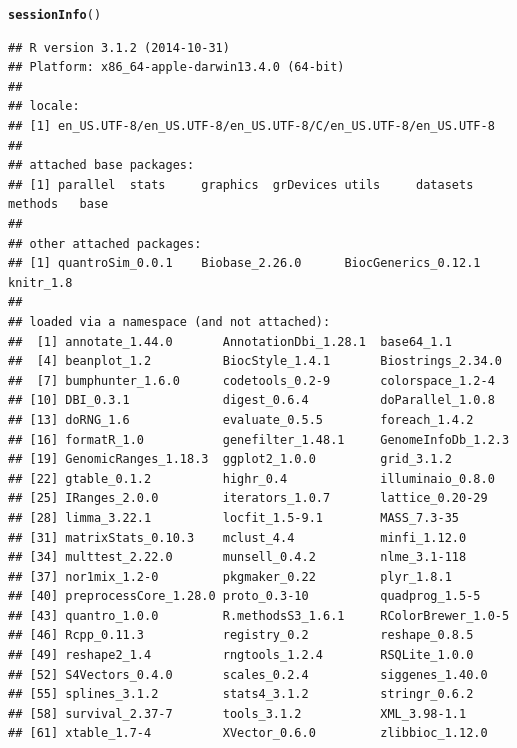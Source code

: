 \documentclass{article}\usepackage[]{graphicx}\usepackage[usenames,dvipsnames]{color}
\makeatletter
\newcommand{\hlstd}[1]{\textcolor[rgb]{0.345,0.345,0.345}{#1}}%
\newcommand{\hlkwd}[1]{\textcolor[rgb]{0.737,0.353,0.396}{\textbf{#1}}}%
\newenvironment{kframe}{%
 \def\at@end@of@kframe{}%
 \ifinner\ifhmode%
  \def\at@end@of@kframe{\end{minipage}}%
  \begin{minipage}{\columnwidth}%
 \fi\fi%
 \def\FrameCommand##1{\hskip\@totalleftmargin \hskip-\fboxsep
 \colorbox{shadecolor}{##1}\hskip-\fboxsep
     \hskip-\linewidth \hskip-\@totalleftmargin \hskip\columnwidth}%
 \MakeFramed {\advance\hsize-\width
   \@totalleftmargin\z@ \linewidth\hsize
   \@setminipage}}%
 {\par\unskip\endMakeFramed%
 \at@end@of@kframe}
\newenvironment{knitrout}{}{} %
\makeatother
\begin{document}
\begin{knitrout}
\color{fgcolor}\begin{kframe}
\begin{alltt}
\hlkwd{sessionInfo}\hlstd{()}
\end{alltt}
\begin{verbatim}
## R version 3.1.2 (2014-10-31)
## Platform: x86_64-apple-darwin13.4.0 (64-bit)
## 
## locale:
## [1] en_US.UTF-8/en_US.UTF-8/en_US.UTF-8/C/en_US.UTF-8/en_US.UTF-8
## 
## attached base packages:
## [1] parallel  stats     graphics  grDevices utils     datasets  methods   base     
## 
## other attached packages:
## [1] quantroSim_0.0.1    Biobase_2.26.0      BiocGenerics_0.12.1 knitr_1.8          
## 
## loaded via a namespace (and not attached):
##  [1] annotate_1.44.0       AnnotationDbi_1.28.1  base64_1.1           
##  [4] beanplot_1.2          BiocStyle_1.4.1       Biostrings_2.34.0    
##  [7] bumphunter_1.6.0      codetools_0.2-9       colorspace_1.2-4     
## [10] DBI_0.3.1             digest_0.6.4          doParallel_1.0.8     
## [13] doRNG_1.6             evaluate_0.5.5        foreach_1.4.2        
## [16] formatR_1.0           genefilter_1.48.1     GenomeInfoDb_1.2.3   
## [19] GenomicRanges_1.18.3  ggplot2_1.0.0         grid_3.1.2           
## [22] gtable_0.1.2          highr_0.4             illuminaio_0.8.0     
## [25] IRanges_2.0.0         iterators_1.0.7       lattice_0.20-29      
## [28] limma_3.22.1          locfit_1.5-9.1        MASS_7.3-35          
## [31] matrixStats_0.10.3    mclust_4.4            minfi_1.12.0         
## [34] multtest_2.22.0       munsell_0.4.2         nlme_3.1-118         
## [37] nor1mix_1.2-0         pkgmaker_0.22         plyr_1.8.1           
## [40] preprocessCore_1.28.0 proto_0.3-10          quadprog_1.5-5       
## [43] quantro_1.0.0         R.methodsS3_1.6.1     RColorBrewer_1.0-5   
## [46] Rcpp_0.11.3           registry_0.2          reshape_0.8.5        
## [49] reshape2_1.4          rngtools_1.2.4        RSQLite_1.0.0        
## [52] S4Vectors_0.4.0       scales_0.2.4          siggenes_1.40.0      
## [55] splines_3.1.2         stats4_3.1.2          stringr_0.6.2        
## [58] survival_2.37-7       tools_3.1.2           XML_3.98-1.1         
## [61] xtable_1.7-4          XVector_0.6.0         zlibbioc_1.12.0
\end{verbatim}
\end{kframe}
\end{knitrout}


% 
\end{document}

